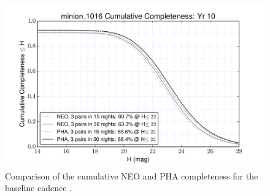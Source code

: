 \begin{figure}[bh]
\includegraphics[angle=0,width=0.49\hsize:,clip]{figs/solarsystem/minion_1016_CumulativeCompleteness_NEO_and_PHA_Cumulative_Completeness.pdf}
\caption{%
Comparison of the cumulative NEO and PHA completeness for the baseline cadence
.}
\label{fig:neopha}
\end{figure}

